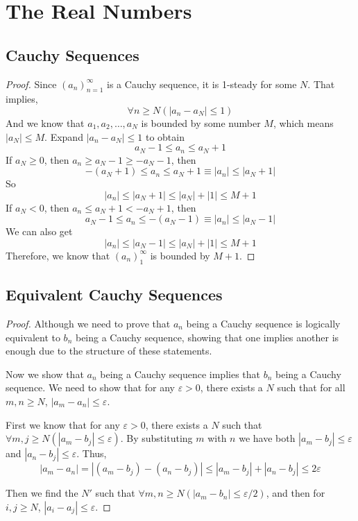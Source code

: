 \section{The Real Numbers}

\subsection{Cauchy Sequences}
\begin{proof}
Since $(a_n)^\infty_{n=1}$ is a Cauchy sequence, it is 1-steady for some $N$. That implies,
\[
\forall n \geq N(|a_n-a_N| \leq 1)
\]
And we know that $a_1,a_2,\dots,a_N$ is bounded by some number $M$, which means $|a_N| \leq M$. Expand $|a_n-a_N| \leq 1$ to obtain 
\[
a_N-1 \leq a_n \leq a_N+1
\]
If $a_N \geq 0$, then $a_n \geq a_N-1 \geq -a_N-1$, then 
\[
-(a_N+1) \leq a_n \leq a_N+1 \equiv |a_n| \leq |a_N+1|
\]
So 
\[
|a_n| \leq |a_N+1| \leq |a_N| + |1| \leq M+1
\]
If $a_N < 0$, then $a_n \leq a_N +1 < -a_N+1$, then
\[
a_N - 1 \leq a_n \leq -(a_N-1) \equiv |a_n| \leq |a_N-1|
\]
We can also get 
\[
|a_n| \leq |a_N-1| \leq |a_N| + |1| \leq M+1
\]
Therefore, we know that $(a_n)^\infty_1$ is bounded by $M+1$.
\end{proof}

\subsection{Equivalent Cauchy Sequences}
\begin{proof}
Although we need to prove that $a_n$ being a Cauchy sequence is logically equivalent to $b_n$ being a Cauchy sequence, showing that one 
implies another is enough due to the structure of these statements.

Now we show that $a_n$ being a Cauchy sequence implies that $b_n$ being a Cauchy sequence. We need to show that for any $\varepsilon >0$, 
there exists a $N$ such that for all $m,n\geq N$, $|a_m-a_n| \leq \varepsilon$. 

First we know that for any $\varepsilon >0$, there exists a $N$ such that $\forall m,j\geq N(|a_m-b_j|\leq \varepsilon)$. By substituting $m$ 
with $n$ we have both $|a_m-b_j|\leq \varepsilon$ and $|a_n-b_j|\leq \varepsilon$.
Thus, 
\[
|a_m-a_n| = |(a_m-b_j) - (a_n-b_j)| \leq |a_m-b_j| + |a_n-b_j| \leq 2\varepsilon
\]

Then we find the $N'$ such that $\forall m,n\geq N(|a_m-b_n| \leq \varepsilon/2)$, and then for $i,j \geq N$, $|a_i-a_j| \leq \varepsilon$.
\end{proof}

